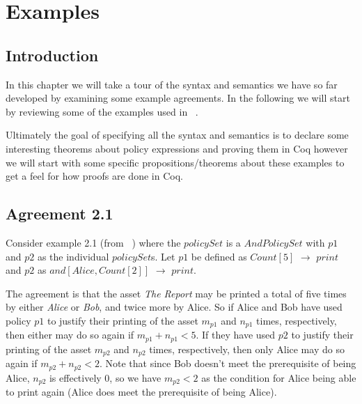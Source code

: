 \chapter{Examples}\label{chap:examples}


\section{Introduction}


In this chapter we will take a tour of the syntax and semantics we have so far developed by examining some example agreements. In the following we will start by reviewing some of the examples used in ~\cite{pucella2006}.

Ultimately the goal of specifying all the syntax and semantics is to declare some interesting theorems about policy expressions and proving them in Coq however we will start with some specific propositions/theorems about these examples to get a feel for how proofs are done in Coq.

\section{Agreement 2.1}

Consider example 2.1 (from ~\cite{pucella2006}) where the $policySet$ is a $AndPolicySet$ with $p1$ and $p2$ as the individual $policySet$s. Let $p1$ be defined as $Count[5]$ $\rightarrow$ $print$ and $p2$ as $and[Alice, Count[2]]$ $\rightarrow$ $print$. 

The agreement is that the asset \emph{The Report} may be printed a total of five times by either \emph{Alice} or \emph{Bob}, and twice more by Alice. So if Alice and Bob have used policy $p1$ to justify their printing of the asset $m_{p1}$ and $n_{p1}$ times, respectively, then either may do so again if $m_{p1} + n_{p1} < 5$. If they have used $p2$ to justify their printing of the asset $m_{p2}$ and $n_{p2}$ times, respectively, then only Alice may do so again if $m_{p2} + n_{p2} < 2$. Note that since Bob doesn't meet the prerequisite of being Alice, $n_{p2}$ is effectively $0$, so we have $m_{p2} < 2$ as the condition for Alice being able to print again (Alice does meet the prerequisite of being Alice).

